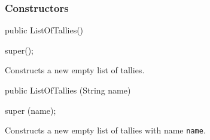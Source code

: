 \subsubsection*{Constructors}
\begin{code}

   public ListOfTallies()\begin{hide} {
      super();
   }\end{hide}
\end{code}
\begin{tabb}   Constructs a new empty list of tallies.
\end{tabb}
\begin{code}

   public ListOfTallies (String name)\begin{hide} {
      super (name);
   }\end{hide}
\end{code}
\begin{tabb}   Constructs a new empty list of tallies with name \texttt{name}.
\end{tabb}
\begin{htmlonly}
\end{htmlonly}
